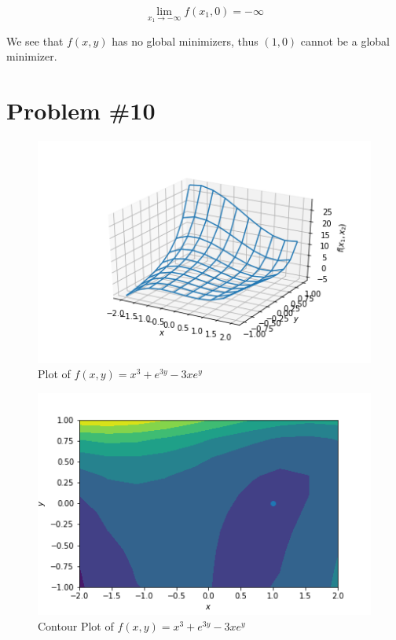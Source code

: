 \documentclass{article}
\begin{document}
\begin{equation*}
    \lim_{x_1 \to -\infty}f(x_1,0) = -\infty
\end{equation*}

We see that $f(x,y)$ has no global minimizers, thus $(1,0)$ cannot be a global minimizer.
\section*{Problem \#10}

\begin{figure}[H]
    \centering
    \includegraphics[scale=0.6]{graph3.png}
    \caption{Plot of $f(x,y) =  x^3 + e^{3y} - 3xe^y$}
    \label{fig:my_label}
\end{figure}

\begin{figure}[H]
    \centering
    \includegraphics[scale=0.6]{graph3Contour.png}
    \caption{Contour Plot of $f(x,y) =  x^3 + e^{3y} - 3xe^y$}
    \label{fig:my_label}
\end{figure}
\end{document}
